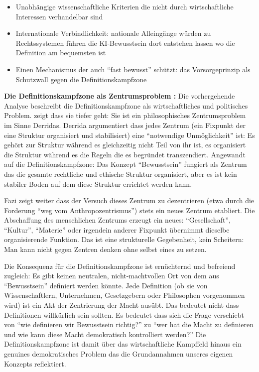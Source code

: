 \documentclass[acmlarge, noacm]{acmart}
\begin{document}
\begin{itemize}
\item Unabhängige wissenschaftliche Kriterien die nicht durch wirtschaftliche Interessen verhandelbar sind
\item Internationale Verbindlichkeit: nationale Alleingänge würden zu Rechtssystemen führen die KI-Bewusstsein dort entstehen lassen wo die Definition am bequemsten ist
\item Einen Mechanismus der auch ``fast bewusst'' schützt: das Vorsorgeprinzip als Schutzwall gegen die Definitionskampfzone
\end{itemize}

\textbf{Die Definitionskampfzone als Zentrumsproblem \cite{fazi2026}:} Die vorhergehende Analyse beschreibt die Definitionskampfzone als wirtschaftliches und politisches Problem. \citet{fazi2026} zeigt dass sie tiefer geht: Sie ist ein philosophisches Zentrumsproblem im Sinne Derridas. Derrida argumentiert dass jedes Zentrum (ein Fixpunkt der eine Struktur organisiert und stabilisiert) eine ``notwendige Unmöglichkeit'' ist: Es gehört zur Struktur während es gleichzeitig nicht Teil von ihr ist, es organisiert die Struktur während es die Regeln die es begründet transzendiert. Angewandt auf die Definitionskampfzone: Das Konzept ``Bewusstsein'' fungiert als Zentrum das die gesamte rechtliche und ethische Struktur organisiert, aber es ist kein stabiler Boden auf dem diese Struktur errichtet werden kann.

Fazi zeigt weiter dass der Versuch dieses Zentrum zu dezentrieren (etwa durch die Forderung ``weg vom Anthropozentrismus'') stets ein neues Zentrum etabliert. Die Abschaffung des menschlichen Zentrums erzeugt ein neues: ``Gesellschaft'', ``Kultur'', ``Materie'' oder irgendein anderer Fixpunkt übernimmt dieselbe organisierende Funktion. Das ist eine strukturelle Gegebenheit, kein Scheitern: Man kann nicht gegen Zentren denken ohne selbst eines zu setzen.

Die Konsequenz für die Definitionskampfzone ist ernüchternd und befreiend zugleich: Es gibt keinen neutralen, nicht-machtvollen Ort von dem aus ``Bewusstsein'' definiert werden könnte. Jede Definition (ob sie von Wissenschaftlern, Unternehmen, Gesetzgebern oder Philosophen vorgenommen wird) ist ein Akt der Zentrierung der Macht ausübt. Das bedeutet nicht dass Definitionen willkürlich sein sollten. Es bedeutet dass sich die Frage verschiebt von ``wie definieren wir Bewusstsein richtig?'' zu ``wer hat die Macht zu definieren und wie kann diese Macht demokratisch kontrolliert werden?'' Die Definitionskampfzone ist damit über das wirtschaftliche Kampffeld hinaus ein genuines demokratisches Problem das die Grundannahmen unseres eigenen Konzepts reflektiert.
\end{document}
